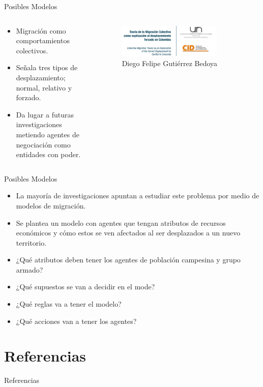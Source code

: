 \documentclass[17pt, t, lualatex]{beamer}
\begin{document}
\begin{frame}{Posibles Modelos}

  \begin{columns}
    \begin{column}{0.5\textwidth}
      \begin{itemize}
        \item Migración como comportamientos colectivos.
        \item Señala tres tipos de desplazamiento; normal, relativo y forzado.
        \item Da lugar a futuras investigaciones metiendo agentes de negociación como entidades con poder.
      \end{itemize}
    \end{column}

    \begin{column}{0.5\textwidth}
  \begin{figure}[ht]
    \centering
    \includegraphics[width=0.8\textwidth]{img/fig3.png}
    \caption{Diego Felipe Gutiérrez Bedoya\cite{gutierrez2012teoria}}
    \label{fig:9}
  \end{figure}
    \end{column}
  \end{columns}

\end{frame}

\begin{frame}{Posibles Modelos}

  \begin{itemize}
    \item La mayoría de investigaciones apuntan a estudiar este problema por medio de modelos de migración.
    \item Se plantea un modelo con agentes que tengan atributos de recursos económicos y cómo estos se ven afectados al ser desplazados a un nuevo territorio.
    \item ¿Qué atributos deben tener los agentes de población campesina y grupo armado?
    \item ¿Qué supuestos se van a decidir en el mode?
    \item ¿Qué reglas va a tener el modelo?
    \item ¿Qué acciones van a tener los agentes?
  \end{itemize}

\end{frame}


\section{Referencias}

\insertsectionpage
\begin{frame}[allowframebreaks]{Referencias}
  \printbibliography
\end{frame}


\insertendpage
\end{document}

